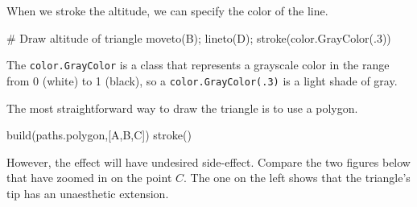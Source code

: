 \documentclass[12pt]{article}
\def\code#1{{\tt #1}}
\begin{document}
When we stroke the altitude, we can specify the color of the
line.
\begin{snippet}
# Draw altitude of triangle
moveto(B); lineto(D);
stroke(color.GrayColor(.3))
\end{snippet}
The \code{color.GrayColor} is a class that represents a grayscale
color in the range from 0 (white) to 1 (black), so a 
\code{color.GrayColor(.3)} is a light shade of gray.

The most straightforward way to draw the triangle is to 
use a polygon.
\begin{snippet}
build(paths.polygon,[A,B,C])
stroke()
\end{snippet}

However, the effect will have undesired side-effect.  Compare the two
figures below that have zoomed in on the point $C$.  The one on the
left shows that the triangle's tip has an unaesthetic extension.
\end{document}
